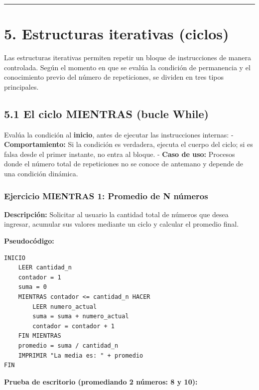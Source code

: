 \begin{center}\rule{0.5\linewidth}{0.5pt}\end{center}

\section{5. Estructuras iterativas
(ciclos)}\label{estructuras-iterativas-ciclos}

Las estructuras iterativas permiten repetir un bloque de instrucciones
de manera controlada. Según el momento en que se evalúa la condición de
permanencia y el conocimiento previo del número de repeticiones, se
dividen en tres tipos principales.

\subsection{5.1 El ciclo MIENTRAS (bucle
While)}\label{el-ciclo-mientras-bucle-while}

Evalúa la condición al \textbf{inicio}, antes de ejecutar las
instrucciones internas: - \textbf{Comportamiento:} Si la condición es
verdadera, ejecuta el cuerpo del ciclo; si es falsa desde el primer
instante, no entra al bloque. - \textbf{Caso de uso:} Procesos donde el
número total de repeticiones no se conoce de antemano y depende de una
condición dinámica.

\subsubsection{Ejercicio MIENTRAS 1: Promedio de N
números}\label{ejercicio-mientras-1-promedio-de-n-nuxfameros}

\textbf{Descripción:} Solicitar al usuario la cantidad total de números
que desea ingresar, acumular sus valores mediante un ciclo y calcular el
promedio final.

\textbf{Pseudocódigo:}

\begin{verbatim}
INICIO
    LEER cantidad_n
    contador = 1
    suma = 0
    MIENTRAS contador <= cantidad_n HACER
        LEER numero_actual
        suma = suma + numero_actual
        contador = contador + 1
    FIN MIENTRAS
    promedio = suma / cantidad_n
    IMPRIMIR "La media es: " + promedio
FIN
\end{verbatim}



\textbf{Prueba de escritorio (promediando 2 números: 8 y 10):}

